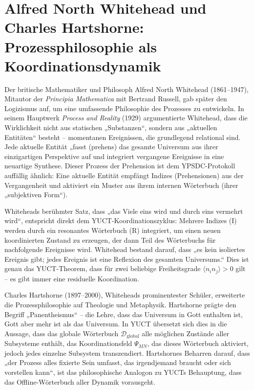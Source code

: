 \documentclass[12pt,a4paper]{article}
\begin{document}
	\section{Alfred North Whitehead und Charles Hartshorne: Prozessphilosophie als Koordinationsdynamik}
	
	Der britische Mathematiker und Philosoph Alfred North Whitehead (1861–1947), Mitautor der \emph{Principia Mathematica} mit Bertrand Russell, gab später den Logizismus auf, um eine umfassende Philosophie des Prozesses zu entwickeln. In seinem Hauptwerk \emph{Process and Reality} (1929) argumentierte Whitehead, dass die Wirklichkeit nicht aus statischen „Substanzen“, sondern aus „aktuellen Entitäten“ besteht – momentanen Ereignissen, die grundlegend relational sind. Jede aktuelle Entität „fasst (prehens) das gesamte Universum aus ihrer einzigartigen Perspektive auf und integriert vergangene Ereignisse in eine neuartige Synthese. Dieser Prozess der Prehension ist dem YPSDC-Protokoll auffällig ähnlich: Eine aktuelle Entität empfängt Indizes (Prehensionen) aus der Vergangenheit und aktiviert ein Muster aus ihrem internen Wörterbuch (ihrer „subjektiven Form“).
	
	Whiteheads berühmter Satz, dass „das Viele eins wird und durch eins vermehrt wird“, entspricht direkt dem YUCT-Koordinationszyklus: Mehrere Indizes (I) werden durch ein resonantes Wörterbuch (R) integriert, um einen neuen koordinierten Zustand zu erzeugen, der dann Teil des Wörterbuchs für nachfolgende Ereignisse wird. Whitehead bestand darauf, dass „es kein isoliertes Ereignis gibt; jedes Ereignis ist eine Reflexion des gesamten Universums.“ Dies ist genau das YUCT-Theorem, dass für zwei beliebige Freiheitsgrade \(\langle n_i n_j \rangle > 0\) gilt – es gibt immer eine residuelle Koordination.
	
	Charles Hartshorne (1897–2000), Whiteheads prominentester Schüler, erweiterte die Prozessphilosophie auf Theologie und Metaphysik. Hartshorne prägte den Begriff „Panentheismus“ – die Lehre, dass das Universum in Gott enthalten ist, Gott aber mehr ist als das Universum. In YUCT übersetzt sich dies in die Aussage, dass das globale Wörterbuch \(\mathcal{D}_{\text{global}}\) alle möglichen Zustände aller Subsysteme enthält, das Koordinationsfeld \(\Psi_{MN}\), das dieses Wörterbuch aktiviert, jedoch jedes einzelne Subsystem transzendiert. Hartshornes Beharren darauf, dass „der Prozess alles fixierte Sein umfasst, das irgendjemand braucht oder sich vorstellen kann“, ist das philosophische Analogon zu YUCTs Behauptung, dass das Offline-Wörterbuch aller Dynamik vorausgeht.
	
\end{document}
